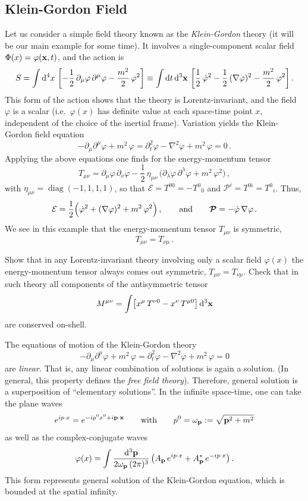 \subsection*{Klein-Gordon Field}

Let us consider a simple field theory known as the \emph{Klein-Gordon} theory
(it will be our main example for some time). It involves a single-component
scalar field $\Phi(x)=\varphi(\mathbf{x},t)$, and the action is
\[
S=\int \mathop{}\!\mathrm{d}^4x\,\left[-\frac12\,\partial_\mu\varphi\,\partial^\mu\varphi-\frac{m^2}{2}\,\varphi^2\right]
\equiv\int \mathop{}\!\mathrm{d} t\mathop{}\!\mathrm{d}^3\mathbf{x}\,\left[\frac12\,\dot\varphi^2-\frac12\,(\nabla\varphi)^2-\frac{m^2}{2}\,\varphi^2\right].
\]
This form of the action shows that the theory is Lorentz-invariant, and the
field $\varphi$ is a scalar (i.e.\ $\varphi(x)$ has definite value at each
space-time point $x$, independent of the choice of the inertial frame).
Variation yields the Klein-Gordon field equation
\[
-\partial_\mu\partial^\mu\varphi+m^2\,\varphi=\partial_t^2\varphi-\nabla^2\varphi+m^2\,\varphi=0\,.
\]
Applying the above equations one finds for the energy-momentum tensor
\[
T_{\mu\nu}=\partial_\mu\varphi\,\partial_\nu\varphi-\frac12\,\eta_{\mu\nu}\,\bigl(\partial_\lambda\varphi\,\partial^\lambda\varphi+m^2\,\varphi^2\bigr)\,,
\]
with $\eta_{\mu\nu}=\operatorname{diag}(-1,1,1,1)$, so that
$\mathcal{E}=T^{00}=-T^0{}_0$ and $\mathcal{P}^i=T^{0i}=T^0{}_i$. Thus,
\[
\mathcal{E}=\frac12\Bigl(\dot\varphi^2+(\nabla\varphi)^2+m^2\,\varphi^2\Bigr)\,,
\qquad\text{and}\qquad
\boldsymbol{\mathcal{P}}=-\dot\varphi\,\nabla\varphi\,.
\]
We see in this example that the energy-momentum tensor $T_{\mu\nu}$ is
symmetric,
\[
T_{\mu\nu}=T_{\nu\mu}\,.
\]

\begin{exercise}
Show that in any Lorentz-invariant theory involving only a scalar field
$\varphi(x)$ the energy-momentum tensor always comes out symmetric,
$T_{\mu\nu}=T_{\nu\mu}$. Check that in such theory all components of the
antisymmetric tensor
\[
M^{\mu\nu}=\int\bigl[x^\mu\,T^{\nu0}-x^\nu\,T^{\mu0}\bigr]\mathop{}\!\mathrm{d}^3\mathbf{x}
\]
are conserved on-shell.
\end{exercise}

The equations of motion of the Klein-Gordon theory
\[
-\partial_\mu\partial^\mu\varphi+m^2\,\varphi=\partial_t^2\varphi-\nabla^2\varphi+m^2\,\varphi=0
\]
are \emph{linear}. That is, any linear combination of solutions is again a
solution. (In general, this property defines the \emph{free field theory}).
Therefore, general solution is a superposition of ``elementary solutions''.
In the infinite space-time, one can take the plane waves
\[
e^{ip\cdot x}=e^{-ip^0x^0+i\mathbf{p}\cdot\mathbf{x}}\qquad\text{with}\qquad p^0=\omega_{\mathbf{p}}:=\sqrt{\mathbf{p}^2+m^2}
\]
as well as the complex-conjugate waves
\begin{equation}\label{eq:KGgeneral}
\varphi(x)=\int\frac{\mathop{}\!\mathrm{d}^3\mathbf{p}}{2\omega_{\mathbf{p}}\,(2\pi)^3}\,\bigl(A_{\mathbf{p}}\,e^{ip\cdot x}+A^*_{\mathbf{p}}\,e^{-ip\cdot x}\bigr)\,.
\end{equation}
This form represents general solution of the Klein-Gordon equation, which is
bounded at the spatial infinity.

